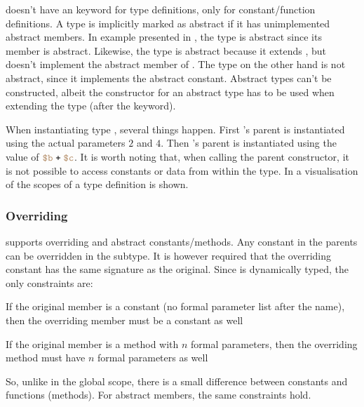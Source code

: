 
\productname{} doesn't have an  keyword for type definitions, only
for constant/function definitions. A type is implicitly marked as abstract if it has
unimplemented abstract members. In example presented in , 
the type  is abstract
since its member  is abstract. Likewise, the type
 is abstract because it extends , but doesn't implement the abstract
member of . The type  on the other hand is not abstract, since it
implements the abstract constant. Abstract types can't be constructed, albeit the
constructor for an abstract type has to be used when extending the type (after the
 keyword).

When instantiating type , several things happen. First 's parent
is instantiated using the actual parameters $2$ and $4$. Then 's parent
is instantiated using the value of $\variable{b}\; \texttt{+}\; \variable{c}$. It is worth
noting that, when calling the parent constructor, it is not possible to access
constants or data from within the type. In  a
visualisation of the scopes of a type definition is shown.


\subsubsection{Overriding}

\productname{} supports overriding and abstract constants/methods. Any constant
in the parents can be overridden in the subtype. It is however required that the
overriding constant has the same signature as the original. Since
\productname{} is dynamically typed, the only constraints are:
\begin{nlist}
\item If the original member is a constant (no formal parameter list after the name),
  then the overriding member must be a constant as well
\item If the original member is a method with $n$ formal parameters, then the
  overriding method must have $n$ formal parameters as well
\end{nlist}

So, unlike in the global scope, there is a small difference between constants and
functions (methods). For abstract members, the same constraints hold.

